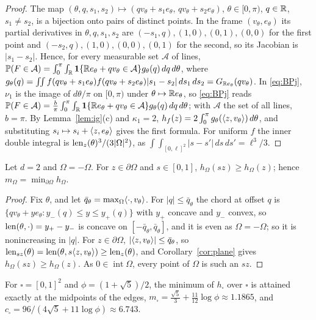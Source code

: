 \documentclass[11pt]{article}
\begin{document}
\begin{proof}
The map $(\theta,q,s_1,s_2)\mapsto(qv_\theta+s_1e_\theta,\,qv_\theta+s_2e_\theta)$, $\theta\in[0,\pi)$, $q\in\mathbb{R}$, $s_1\ne s_2$, is a bijection onto pairs of
distinct points. In the frame $(v_\theta,e_\theta)$ its partial derivatives in $\theta,q,s_1,s_2$ are $(-s_1,q),(1,0),(0,1),(0,0)$ for the
first point and $(-s_2,q),(1,0),(0,0),(0,1)$ for the second, so its Jacobian is $|s_1-s_2|$. Hence, for every measurable set $\mathcal A$
of lines, $\mathbb{P}(F\in\mathcal A)=\int_0^\pi\int_{\mathbb{R}}\mathbf{1}\{\mathbb{R} e_\theta+qv_\theta\in\mathcal A\}g_\theta(q)\,dq\,d\theta$, where
$g_\theta(q)=\int\!\!\int f(qv_\theta+s_1e_\theta)f(qv_\theta+s_2e_\theta)|s_1-s_2|\,ds_1\,ds_2=G_{\mathbb{R} e_\theta}(qv_\theta)$. In \eqref{eq:BPj}, $\nu_1$ is the
image of $d\theta/\pi$ on $[0,\pi)$ under $\theta\mapsto\mathbb{R} e_\theta$, so \eqref{eq:BPj} reads
$\mathbb{P}(F\in\mathcal A)=\frac b\pi\int_0^\pi\int_{\mathbb{R}}\mathbf{1}\{\mathbb{R} e_\theta+qv_\theta\in\mathcal A\}g_\theta(q)\,dq\,d\theta$; with $\mathcal A$ the set of all lines,
$b=\pi$. By Lemma~\ref{lem:ig}(c) and $\kappa_1=2$, $h_f(z)=2\int_0^\pi g_\theta(\langle z,v_\theta\rangle)\,d\theta$, and substituting $s_i\mapsto s_i+\langle z,e_\theta\rangle$ gives
the first formula. For uniform $f$ the inner double integral is $\operatorname{len}_z(\theta)^3/(3|\Omega|^2)$, as $\int\!\!\int_{[0,\ell]^2}|s-s'|\,ds\,ds'=\ell^3/3$.
\end{proof}

\begin{lemma}\label{lem:sym}
Let $d=2$ and $\Omega=-\Omega$. For $z\in\partial\Omega$ and $s\in[0,1]$, $h_\Omega(sz)\ge h_\Omega(z)$; hence $m_\Omega=\min_{\partial\Omega}h_\Omega$.
\end{lemma}

\begin{proof}
Fix $\theta$, and let $\bar q_\theta=\max_\Omega\langle \cdot,v_\theta\rangle$. For $|q|\le\bar q_\theta$ the chord at offset $q$ is $\{qv_\theta+ye_\theta:y_-(q)\le y\le y_+(q)\}$
with $y_+$ concave and $y_-$ convex, so $\operatorname{len}(\theta,\cdot)=y_+-y_-$ is concave on $[-\bar q_\theta,\bar q_\theta]$, and it is even as $\Omega=-\Omega$; so it is
nonincreasing in $|q|$. For $z\in\partial\Omega$, $|\langle z,v_\theta\rangle|\le\bar q_\theta$, so $\operatorname{len}_{sz}(\theta)=\operatorname{len}(\theta,s\langle z,v_\theta\rangle)\ge\operatorname{len}_z(\theta)$, and
Corollary~\ref{cor:plane} gives $h_\Omega(sz)\ge h_\Omega(z)$. As $0\in\operatorname{int}\Omega$, every point of $\Omega$ is such an $sz$.
\end{proof}

\begin{corollary}\label{cor:square}
For $\square=[0,1]^2$ and $\phi=(1+\sqrt5)/2$, the minimum of $h_\square$ over $\square$ is attained exactly at the midpoints of
the edges, $m_\square=\frac{\sqrt5}3+\frac{11}{12}\log\phi\approx1.1865$, and $c_\square=96/(4\sqrt5+11\log\phi)\approx6.743$.
\end{corollary}
\end{document}
